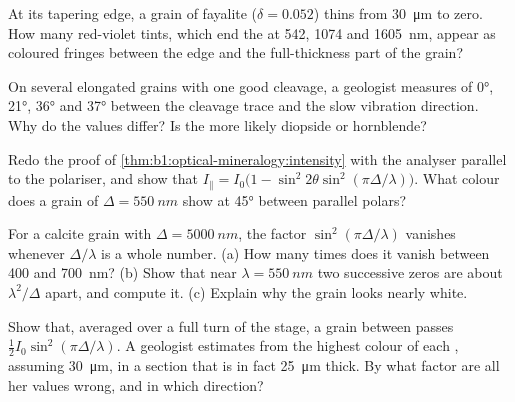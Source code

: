 \begin{exercise}[$\star\star$]\label{exo:b1:optical-mineralogy:8}
At its tapering edge, a grain of fayalite ($\delta = 0.052$) thins from
\qty{30}{\micro m} to zero. How many red-violet tints, which end the 
at 542, 1074 and \qty{1605}{nm}, appear as coloured fringes between the edge
and the full-thickness part of the grain?
\end{exercise}

\begin{exercise}[$\star\star$]\label{exo:b1:optical-mineralogy:9}
On several elongated grains with one good cleavage, a geologist measures
 of \ang{0}, \ang{21}, \ang{36} and \ang{37} between the
cleavage trace and the slow vibration direction. Why do the values differ?
Is the  more likely diopside or hornblende?
\end{exercise}

\begin{exercise}[$\star\star\star$]\label{exo:b1:optical-mineralogy:10}
Redo the proof of \cref{thm:b1:optical-mineralogy:intensity} with the
analyser parallel to the polariser, and show that
$I_\parallel = I_0\bigl(1 - \sin^2 2\theta\sin^2(\pi\Delta/\lambda)\bigr)$.
What colour does a grain of $\Delta = \qty{550}{nm}$ show at \ang{45}
between parallel polars?
\end{exercise}

\begin{exercise}[$\star\star\star$]\label{exo:b1:optical-mineralogy:11}
For a calcite grain with $\Delta = \qty{5000}{nm}$, the factor
$\sin^2(\pi\Delta/\lambda)$ vanishes whenever $\Delta/\lambda$ is a whole
number. (a) How many times does it vanish between \num{400} and
\qty{700}{nm}? (b) Show that near $\lambda = \qty{550}{nm}$ two successive
zeros are about $\lambda^2/\Delta$ apart, and compute it. (c) Explain why the
grain looks nearly white.
\end{exercise}

\begin{exercise}[$\star\star\star$]\label{exo:b1:optical-mineralogy:12}
Show that, averaged over a full turn of the stage, a grain between  passes $\frac12 I_0\sin^2(\pi\Delta/\lambda)$. A geologist estimates
 from the highest colour of each , assuming
\qty{30}{\micro m}, in a section that is in fact \qty{25}{\micro m} thick. By
what factor are all her values wrong, and in which direction?
\end{exercise}

